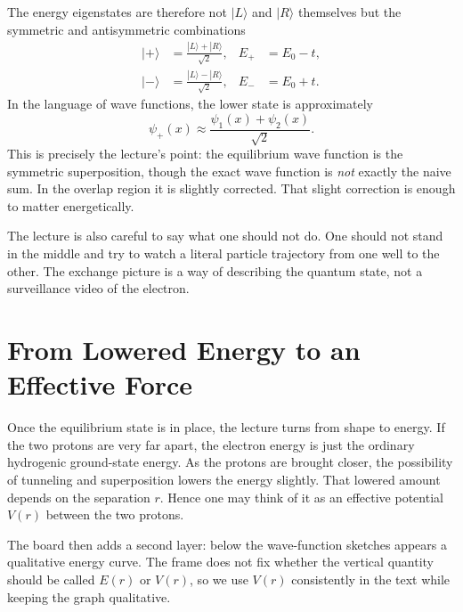 The energy eigenstates are therefore not \(|L\rangle\) and \(|R\rangle\) themselves but the symmetric and antisymmetric combinations
\begin{align}
|+\rangle &= \frac{|L\rangle+|R\rangle}{\sqrt2}, &
E_+ &= E_0-t,\\
|-\rangle &= \frac{|L\rangle-|R\rangle}{\sqrt2}, &
E_- &= E_0+t.
\end{align}
In the language of wave functions, the lower state is approximately
\begin{equation}
\psi_+(x)\approx \frac{\psi_1(x)+\psi_2(x)}{\sqrt2}.
\end{equation}
This is precisely the lecture's point: the equilibrium wave function is the symmetric superposition, though the exact wave function is \emph{not} exactly the naive sum. In the overlap region it is slightly corrected. That slight correction is enough to matter energetically.

The lecture is also careful to say what one should not do. One should not stand in the middle and try to watch a literal particle trajectory from one well to the other. The exchange picture is a way of describing the quantum state, not a surveillance video of the electron.

\section{From Lowered Energy to an Effective Force}

Once the equilibrium state is in place, the lecture turns from shape to energy. If the two protons are very far apart, the electron energy is just the ordinary hydrogenic ground-state energy. As the protons are brought closer, the possibility of tunneling and superposition lowers the energy slightly. That lowered amount depends on the separation \(r\). Hence one may think of it as an effective potential \(V(r)\) between the two protons.

The board then adds a second layer: below the wave-function sketches appears a qualitative energy curve. The frame does not fix whether the vertical quantity should be called \(E(r)\) or \(V(r)\), so we use \(V(r)\) consistently in the text while keeping the graph qualitative.

